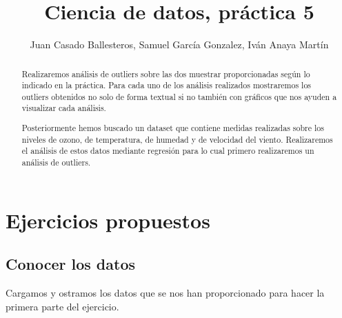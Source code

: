 \documentclass [a4paper] {article}
\title{Ciencia de datos, práctica 5}
\author{Juan Casado Ballesteros, Samuel García Gonzalez, Iván Anaya Martín}
\begin{document}
\maketitle

\begin{abstract}
Realizaremos análisis de outliers sobre las dos muestrar proporcionadas según lo indicado en la práctica.
Para cada uno de los análisis realizados mostraremos los outliers obtenidos no solo de forma textual si no también con gráficos que nos ayuden a visualizar cada análisis.

Posteriormente hemos buscado un dataset que contiene medidas realizadas sobre los niveles de ozono, de temperatura, de humedad y de velocidad del viento.
Realizaremos el análisis de estos datos mediante regresión para lo cual primero realizaremos un análisis de outliers.
\end{abstract}

\newpage
\tableofcontents


\newpage
\section{Ejercicios propuestos}
\subsection{Conocer los datos}
Cargamos y ostramos los datos que se nos han proporcionado para hacer la primera parte del ejercicio.
\end{document}
